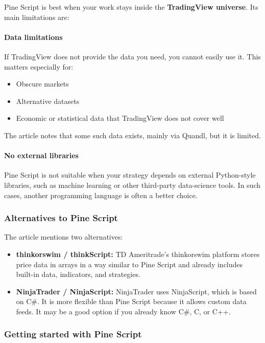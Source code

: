 \documentclass[12pt,openany]{book}
\begin{document}
Pine Script is best when your work stays inside the \textbf{TradingView universe}. Its main limitations are:

\paragraph{Data limitations}

If TradingView does not provide the data you need, you cannot easily use it. This matters especially for:

\begin{itemize}[leftmargin=*]
    \item Obscure markets
    \item Alternative datasets
    \item Economic or statistical data that TradingView does not cover well
\end{itemize}

The article notes that some such data exists, mainly via Quandl, but it is limited.

\paragraph{No external libraries}

Pine Script is not suitable when your strategy depends on external Python-style libraries, such as machine learning or other third-party data-science tools. In such cases, another programming language is often a better choice.

\subsubsection{Alternatives to Pine Script}

The article mentions two alternatives:

\begin{itemize}[leftmargin=*]
    \item \textbf{thinkorswim / thinkScript:} TD Ameritrade's thinkorswim platform stores price data in arrays in a way similar to Pine Script and already includes built-in data, indicators, and strategies.
    \item \textbf{NinjaTrader / NinjaScript:} NinjaTrader uses NinjaScript, which is based on C\#. It is more flexible than Pine Script because it allows custom data feeds. It may be a good option if you already know C\#, C, or C++.
\end{itemize}

\subsubsection{Getting started with Pine Script}
\end{document}
